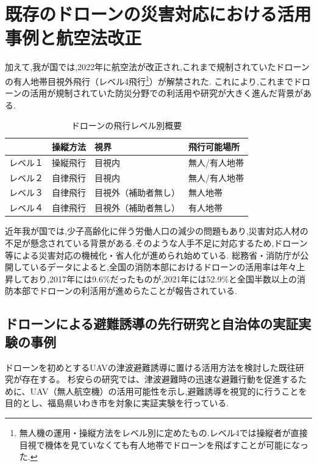 \section{既存のドローンの災害対応における活用事例と航空法改正}
加えて,我が国では,2022年に航空法が改正され,これまで規制されていたドローンの有人地帯目視外飛行（レベル4飛行\footnote{無人機の運用・操縦方法をレベル別に定めたもの.レベル4では操縦者が直接目視で機体を見ていなくても有人地帯でドローンを飛ばすことが可能になった.}）が解禁された.
これにより,これまでドローンの活用が規制されていた防災分野での利活用や研究が大きく進んだ背景がある.\par 
\begin{table}[H]
  \centering
  \begin{tabular}{|l|lll|}
  \hline
       & 操縦方法 & 視界         & 飛行可能場所  \\ \hline
  レベル１ & 操縦飛行 & 目視内        & 無人/有人地帯 \\ \hline
  レベル２ & 自律飛行 & 目視内        & 無人/有人地帯 \\ \hline
  レベル３ & 自律飛行 & 目視外（補助者無し） & 無人地帯    \\ \hline
  レベル４ & 自律飛行 & 目視外（補助者無し） & 有人地帯    \\ \hline
  \end{tabular}
  \caption{ドローンの飛行レベル別概要}
\end{table}
近年我が国では,少子高齢化に伴う労働人口の減少の問題もあり,災害対応人材の不足が懸念されている背景がある.そのような人手不足に対応するため,ドローン等による災害対応の機械化・省人化が進められ始めている.
総務省・消防庁が公開しているデータ\cite{soumusho-01}によると,全国の消防本部におけるドローンの活用率は年々上昇しており,2017年には9.6\%だったものが,2021年には52.9\%と全国半数以上の消防本部でドローンの利活用が進めらたことが報告されている.

\subsection{ドローンによる避難誘導の先行研究と自治体の実証実験の事例}
ドローンを初めとするUAVの津波避難誘導に置ける活用方法を検討した既往研究が存在する。
杉安らの研究では、津波避難時の迅速な避難行動を促進するために、UAV（無人航空機）の活用可能性を示し,避難誘導を視覚的に行うことを目的とし、福島県いわき市を対象に実証実験を行っている\cite{sugiyasu2018uav}.

